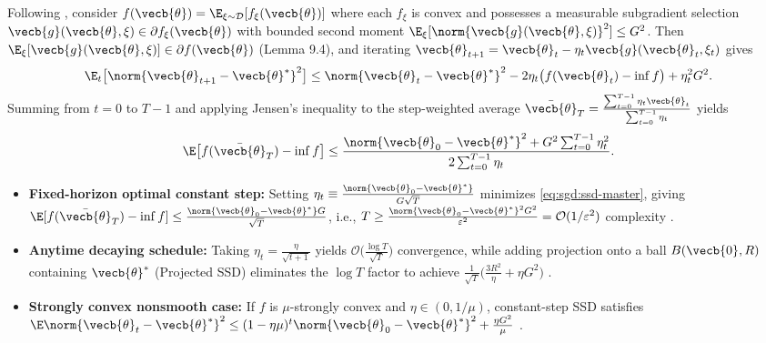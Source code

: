 \documentclass[../../../../master.tex]{subfiles}
\begin{document}
\begin{coremath}
Following , consider $f(\vecb{\theta}) = \E_{\xi\sim\mathcal{D}}[f_\xi(\vecb{\theta})]$ where each $f_\xi$ is convex and possesses a measurable subgradient selection $\vecb{g}(\vecb{\theta}, \xi) \in \partial f_\xi(\vecb{\theta})$ with bounded second moment $\E_\xi[\norm{\vecb{g}(\vecb{\theta}, \xi)}^2] \le G^2$. Then $\E_\xi[\vecb{g}(\vecb{\theta}, \xi)] \in \partial f(\vecb{\theta})$ (Lemma 9.4), and iterating $\vecb{\theta}_{t+1} = \vecb{\theta}_t - \eta_t \vecb{g}(\vecb{\theta}_t, \xi_t)$ gives
\begin{equation}
\label{eq:sgd:ssd-step}
\E_t\bigl[\norm{\vecb{\theta}_{t+1} - \vecb{\theta}^*}^2\bigr]
\le \norm{\vecb{\theta}_t - \vecb{\theta}^*}^2 - 2\eta_t\bigl(f(\vecb{\theta}_t) - \inf f\bigr) + \eta_t^2 G^2.
\end{equation}
Summing from $t=0$ to $T-1$ and applying Jensen's inequality to the step-weighted average $\bar{\vecb{\theta}}_T = \frac{\sum_{t=0}^{T-1}\eta_t\vecb{\theta}_t}{\sum_{t=0}^{T-1}\eta_t}$ yields
\begin{equation}
\label{eq:sgd:ssd-master}
\E\bigl[f(\bar{\vecb{\theta}}_T) - \inf f\bigr]
\le \frac{\norm{\vecb{\theta}_0 - \vecb{\theta}^*}^2 + G^2\sum_{t=0}^{T-1}\eta_t^2}{2\sum_{t=0}^{T-1}\eta_t}.
\end{equation}
\begin{itemize}
  \item \textbf{Fixed-horizon optimal constant step:} Setting $\eta_t \equiv \frac{\norm{\vecb{\theta}_0 - \vecb{\theta}^*}}{G\sqrt{T}}$ minimizes \eqref{eq:sgd:ssd-master}, giving $\E[f(\bar{\vecb{\theta}}_T) - \inf f] \le \frac{\norm{\vecb{\theta}_0 - \vecb{\theta}^*} G}{\sqrt{T}}$, i.e., $T \ge \frac{\norm{\vecb{\theta}_0 - \vecb{\theta}^*}^2 G^2}{\varepsilon^2} = \mathcal{O}(1/\varepsilon^2)$ complexity .
  \item \textbf{Anytime decaying schedule:} Taking $\eta_t = \frac{\eta}{\sqrt{t+1}}$ yields $\mathcal{O}\bigl(\frac{\log T}{\sqrt{T}}\bigr)$ convergence, while adding projection onto a ball $B(\vecb{0}, R)$ containing $\vecb{\theta}^*$ (Projected SSD) eliminates the $\log T$ factor to achieve $\frac{1}{\sqrt{T}}\bigl(\frac{3R^2}{\eta} + \eta G^2\bigr)$ .
  \item \textbf{Strongly convex nonsmooth case:} If $f$ is $\mu$-strongly convex and $\eta \in (0, 1/\mu)$, constant-step SSD satisfies $\E\norm{\vecb{\theta}_t - \vecb{\theta}^*}^2 \le (1-\eta\mu)^t\norm{\vecb{\theta}_0 - \vecb{\theta}^*}^2 + \frac{\eta G^2}{\mu}$ .
\end{itemize}
\end{coremath}
\end{document}
